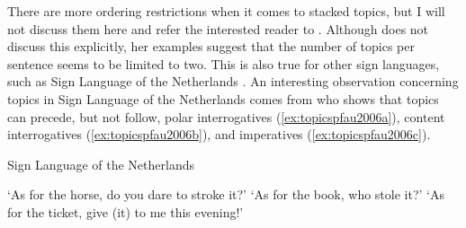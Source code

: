 \noindent There are more ordering restrictions when it comes to stacked topics, but I will not discuss them here and refer the interested reader to \citet{aarons1996topics}. Although \citet{aarons1996topics} does not discuss this explicitly, her examples suggest that the number of topics per sentence seems to be limited to two. This is also true for other sign languages, such as Sign Language of the Netherlands \citep{pfau2008topics}. An interesting observation concerning topics in Sign Language of the Netherlands comes from \citet{pfau2008topics} who shows that topics can precede, but not follow, polar interrogatives (\ref{ex:topicspfau2006a}), content interrogatives (\ref{ex:topicspfau2006b}), and imperatives (\ref{ex:topicspfau2006c}).

\begin{exe}
\ex Sign Language of the Netherlands\label{topicspfau2006}
\begin{xlist} 
\ex {} 
\glt `As for the horse, do you dare to stroke it?' \label{ex:topicspfau2006a} 
\ex {} 
%
\glt `As for the book, who stole it?' \label{ex:topicspfau2006b} 
\ex {} 
%
\glt `As for the ticket, give (it) to me this evening!' \label{ex:topicspfau2006c} 
\end{xlist}
\end{exe} 


